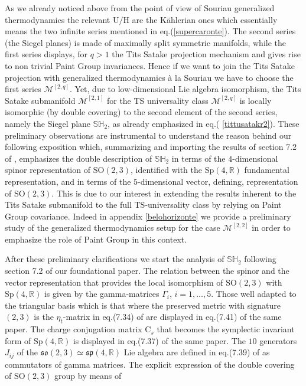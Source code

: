 \documentclass[10pt,a4paper]{article}
\newcommand{\so}{\mathfrak{so}}
\newcommand{\sym}{\mathfrak{sp}}
\begin{document}
As we already noticed above from the point of view of Souriau generalized thermodynamics the relevant $\mathrm{U/H}$ are the K\"ahlerian ones which essentially means the two infinite series mentioned in eq.(\ref{supercaronte}). The second series (the Siegel planes) is made of maximally split symmetric manifolds, while the first series displays, for
$q>1$ the Tits Satake projection mechanism and gives rise to non trivial Paint Group invariances. Hence if we want to join the Tits Satake projection with generalized thermodynamics {\`a} la Souriau we have to choose the first series
$\mathcal{M}^{[2,q]}$. Yet, due to low-dimensional Lie algebra isomorphism, the Tits Satake submanifold $\mathcal{M}^{[2,1]}$ for the TS universality class $\mathcal{M}^{[2,q]}$ is locally isomorphic (by double covering) to the second element of the second series, namely the Siegel plane $\mathbb{SH}_2$, as already emphasized in eq.(
\ref{tittusatakr2}). These preliminary observations are instrumental to understand the reason behind our following exposition which, summarizing and importing the results of section 7.2 of \cite{pgtstheory}, emphasizes the double description of $\mathbb{SH}_2$ in terms of the $4$-dimensional spinor representation of $\mathrm{SO(2,3)}$, identified with the $\mathrm{Sp(4,\mathbb{R})}$ fundamental representation, and in terms of the $5$-dimensional vector, defining, representation of $\mathrm{SO(2,3)}$. This is due to our interest in extending the results inherent to the Tits Satake submanifold to the full TS-universality class by relying on Paint Group covariance. Indeed in appendix \ref{belohorizonte} we provide a preliminary study of the generalized thermodynamics setup for the  case $\mathcal{M}^{[2,2]}$ in order to emphasize the role of Paint Group in this context.
\par
After these preliminary clarifications we start the analysis of $\mathbb{SH}_2$ following section 7.2 of our
foundational paper. The relation between the spinor and the vector representation that provides the local isomorphism of $\mathrm{SO(2,3)}$ with $\mathrm{Sp(4,\mathbb{R})}$ is given by the gamma-matrices $\Gamma_i$, $i=1,\dots,5$. Those well adapted to the triangular basis which is that where the preserved metric with signature $(2,3)$ is the $\eta_t$-matrix in eq.(7.34) of \cite{pgtstheory} are displayed in eq.(7.41) of the same paper.
The charge conjugation matrix $\mathrm{C}_s$ that becomes the symplectic invariant form of $\mathrm{Sp(4,\mathbb{R})}$ is displayed in eq.(7.37) of the same paper. The $10$ generators $J_{ij}$ of the
$\so(2,3) \simeq \sym(4,\mathbb{R})$ Lie algebra are defined in eq.(7.39) of \cite{pgtstheory} as commutators of gamma matrices. The explicit expression of the double covering of $\mathrm{SO(2,3)}$ group by means of
\end{document}

